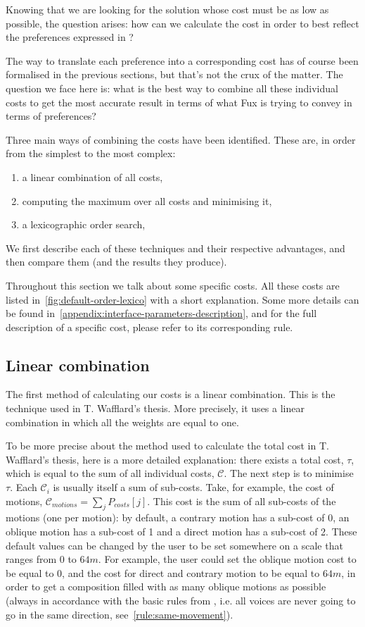 Knowing that we are looking for the solution whose cost must be as low as possible, the question arises: how can we calculate the cost in order to best reflect the preferences expressed in \gap?

The way to translate each preference into a corresponding cost has of course been formalised in the previous sections, but that's not the crux of the matter. The question we face here is: what is the best way to combine all these individual costs to get the most accurate result in terms of what Fux is trying to convey in terms of preferences?

Three main ways of combining the costs have been identified. These are, in order from the simplest to the most complex:
\begin{enumerate}
    \item a linear combination of all costs,
    \item computing the maximum over all costs and minimising it,
    \item a lexicographic order search, 
\end{enumerate}
We first describe each of these techniques and their respective advantages, and then compare them (and the results they produce).

Throughout this section we talk about some specific costs. All these costs are listed in~\ref{fig:default-order-lexico} with a short explanation. Some more details can be found in~\ref{appendix:interface-parameters-description}, and for the full description of a specific cost, please refer to its corresponding rule. 


\subsection{Linear combination}


The first method of calculating our costs is a linear combination. This is the technique used in T. Wafflard's thesis. More precisely, it uses a linear combination in which all the weights are equal to one.



To be more precise about the method used to calculate the total cost in T. Wafflard's thesis, here is a more detailed explanation: there exists a total cost, $\tau$, which is equal to the sum of all individual costs, $\mathcal{C}$. The next step is to minimise $\tau$. Each $\mathcal{C}_i$ is usually itself a sum of sub-costs. Take, for example, the cost of motions, $\mathcal{C}_{motions} = \sum_j P_{costs}[j] $. This cost is the sum of all sub-costs of the motions (one per motion): by default, a contrary motion has a sub-cost of 0, an oblique motion has a sub-cost of 1 and a direct motion has a sub-cost of 2. These default values can be changed by the user to be set somewhere on a scale that ranges from $0$ to $64m$. For example, the user could set the oblique motion cost to be equal to $0$, and the cost for direct and contrary motion to be equal to $64m$, in order to get a composition filled with as many oblique motions as possible (always in accordance with the basic rules from \gap, i.e. all voices are never going to go in the same direction, see~\ref{rule:same-movement}).

